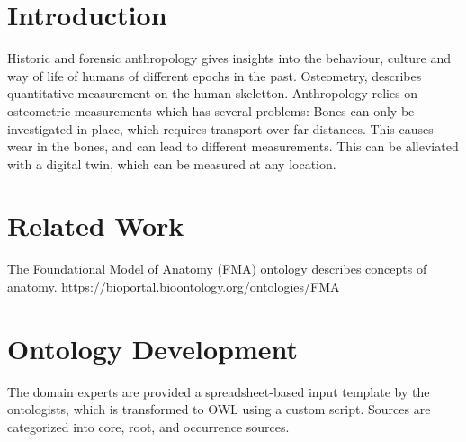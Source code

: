 \documentclass[sw]{iosart2x}
\newcommand{\aw}{AnthroWorks3D}
\begin{document}
\begin{frontmatter}
\begin{abstract}
Anthropology relies on osteometric measurements of human bones, but ...
In this paper, first, we describe the anthropology domain.
Then, we discuss design decisions of modelling ANNO.
Next, we show how ANNO is published for the community.
Finally, we describe the integration of the ontology into \aw{}.
\end{abstract}

\begin{keyword}
\end{keyword}

\end{frontmatter}


\section{Introduction}\label{sec:introduction}
Historic and forensic anthropology gives insights into the behaviour, culture and way of life of humans of different epochs in the past.
Osteometry, describes quantitative measurement on the human skeletton.
Anthropology relies on osteometric measurements which has several problems:
Bones can only be investigated in place, which requires transport over far distances.
This causes wear in the bones, and can lead to different measurements.
This can be alleviated with a digital twin, which can be measured at any location.

\section{Related Work}
The Foundational Model of Anatomy (FMA) ontology \cite{fma} describes concepts of anatomy.
\url{https://bioportal.bioontology.org/ontologies/FMA}

\section{Ontology Development}
The domain experts are provided a spreadsheet-based input template by the ontologists,
which is transformed to OWL using a custom script.
Sources are categorized into core, root, and occurrence sources.
\end{document}
